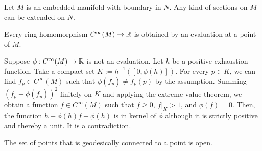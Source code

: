 \documentclass[a4paper]{article}
\begin{document}
\begin{prop}
Let $M$ is an embedded manifold with boundary in $N$.
Any kind of sections on $M$ can be extended on $N$.
\end{prop}

\begin{prop}
Every ring homomorphism $C^\infty(M)\to\mathbb{R}$ is obtained by an evaluation at a point of $M$.
\end{prop}
\begin{pf}
Suppose $\phi:C^\infty(M)\to\mathbb{R}$ is not an evaluation.
Let $h$ be a positive exhaustion function.
Take a compact set $K:=h^{-1}([0,\phi(h)])$.
For every $p\in K$, we can find $f_p\in C^\infty(M)$ such that $\phi(f_p)\ne f_p(p)$ by the assumption.
Summing $(f_p-\phi(f_p))^2$ finitely on $K$ and applying the extreme value theorem, we obtain a function $f\in C^\infty(M)$ such that $f\ge0$, $f|_K>1$, and $\phi(f)=0$.
Then, the function $h+\phi(h)f-\phi(h)$ is in kernel of $\phi$ although it is strictly positive and thereby a unit.
It is a contradiction.
\end{pf}


\begin{prop}
The set of points that is geodesically connected to a point is open.
\end{prop}
\end{document}
